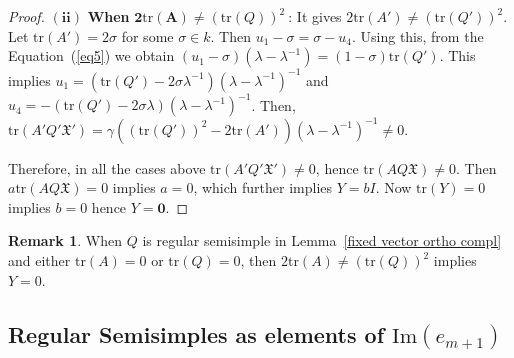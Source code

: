 \documentclass[10pt,twoside]{amsart}
\newcommand{\tr}{\mathrm{tr}}
\newcommand{\im}{\mathrm{Im}}
\theoremstyle{definition}
\theoremstyle{definition}
\newtheorem{remark}[theorem]{Remark}
\begin{document}
\begin{proof}
\noindent $\mathbf{(ii)}$ \textbf{When} $ \mathbf{2\tr(A)\neq} (\tr(Q))^2\ $: It gives $2\tr(A')\neq (\tr(Q'))^2$. Let $\tr(A') = 2\sigma$ for some $\sigma \in k$. Then $u_1-\sigma = \sigma - u_4$. Using this, from the Equation~(\ref{eq5}) we obtain $(u_1-\sigma)(\lambda-\lambda^{-1})=(1-\sigma)\tr(Q')$. This implies $u_1 = (\tr(Q')-2\sigma\lambda^{-1})(\lambda-\lambda^{-1})^{-1}$ and $u_4=-(\tr(Q')-2\sigma\lambda)(\lambda-\lambda^{-1})^{-1}$. Then, $\tr(A'Q'\mathfrak{X}') = \gamma((\tr(Q'))^2-2\tr(A'))(\lambda-\lambda^{-1})^{-1}\neq 0$.
       
Therefore, in all the cases above $\tr(A'Q'\mathfrak{X}')\neq 0$, hence $\tr(AQ\mathfrak{X})\neq 0$. Then $a \tr(AQ\mathfrak{X}) = 0$ implies $a=0$, which further implies $Y=bI$. Now $\tr(Y)=0$ implies $b=0$ hence  $Y=\mathbf{0}$.
\end{proof}

\begin{remark}
When $Q$ is regular semisimple in Lemma~\ref{fixed vector ortho compl} and either $\tr(A)=0$ or $\tr(Q)= 0$, then $2\tr(A)\neq (\tr(Q))^2$ implies $Y=0$.
\end{remark}


\subsection{Regular Semisimples as elements of $\im(e_{m+1})$}{\label{reg-sem}}
\end{document}
